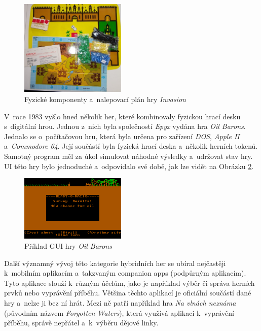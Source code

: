 \begin{figure}[H]
    \centering
    \includegraphics[width=0.45\textwidth]{resources/figures/invasion.jpg}
    \caption{Fyzické komponenty a~nalepovací plán hry \textit{Invasion} \cite{invasion}}
    \label{fig:invasion}
\end{figure}

V~roce 1983 vyšlo hned několik her, které kombinovaly fyzickou hrací desku s~digitální hrou. Jednou z~nich byla společností \textit{Epyx} vydána hra \textit{Oil Barons}. Jednalo se o~počítačovou hru, která byla určena pro zařízení \textit{DOS}, \textit{Apple II} a~\textit{Commodore 64}. Její součástí byla fyzická hrací deska a~několik herních tokenů. Samotný program měl za úkol simulovat náhodné výsledky a~udržovat stav hry. UI této hry bylo jednoduché a~odpovídalo své době, jak lze vidět na Obrázku \ref{fig:oil_barons}. \cite{oil_barons}

\begin{figure}[H]
    \centering
    \includegraphics[width=0.45\textwidth]{resources/figures/oil_barons.png}
    \caption{Příklad GUI hry \textit{Oil Barons} \cite{oil_barons}}
    \label{fig:oil_barons}
\end{figure}

Další významný vývoj této kategorie hybridních her se ubíral nejčastěji k~mobilním aplikacím a~takzvaným companion apps (podpůrným aplikacím). Tyto aplikace slouží k~různým účelům, jako je například výběr či správa herních prvků nebo vyprávění příběhu. Většina těchto aplikací je oficiální součástí dané hry a~nelze ji bez ní hrát. Mezi ně patří například hra \textit{Na vlnách neznáma} (původním názvem \textit{Forgotten Waters}), která využívá aplikaci k~vyprávění příběhu, správě nepřátel a~k~výběru dějové linky.

